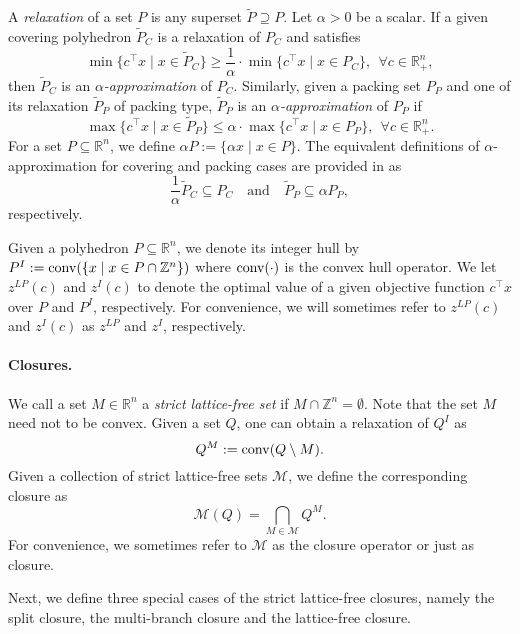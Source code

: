 \documentclass[11pt]{article}
\newcommand{\Z}{\mathbb{Z}}
\newcommand{\R}{\mathbb{R}}
\newcommand{\seq}{\subseteq}
\DeclareMathOperator{\conv}{conv}
\newcommand{\Mset}{M}
\newcommand{\M}{\mathcal{\Mset}}
\newcommand{\cred}{\color{black}}
\newcommand{\zLPc}{z^{LP}(c)}
\newcommand{\zIc}{z^{I}(c)}
\def\conv{\mathop{\rm conv}}
\begin{document}
  
{\cred  A \emph{relaxation} of a set $P$ is any superset $\tilde{P} \supseteq P$.} Let $\alpha > 0$ be a scalar. If a given covering polyhedron $\tilde{P}_C$ is a relaxation of $P_C$ and satisfies
$$\min\{c^\top x \mid x \in \tilde{P}_C\} \ge \frac{1}{\alpha} \cdot \min\{c^\top x \mid x \in P_C\}, \ \ \forall c \in \R_+^n,$$
then $\tilde{P}_C$ is an \emph{$\alpha$-approximation} of $P_C$. Similarly, given a packing set $P_P$ and one of its relaxation $\tilde{P}_P$ of packing type, $\tilde{P}_P$ is an \emph{$\alpha$-approximation} of $P_P$ if 
$$\max\{c^\top x \mid x \in \tilde{P}_P\} \le \alpha \cdot \max\{c^\top x \mid x \in P_P \}, \ \ \forall c \in \R_+^n.$$
For a set $P \subseteq \R^n$, we define $\alpha P:= \{\alpha x \mid  x \in P\}$. 
The equivalent definitions of $\alpha$-approximation for covering and packing cases are provided in \cite{bodur2016aggregation} as
$$\frac{1}{\alpha} \tilde{P}_C  \seq P_C \quad \text{and} \quad \tilde{P}_P \seq \alpha P_P,$$
respectively.

Given a polyhedron $P \seq \R^n$, we denote its integer hull by $P^I := \conv( \{x \mid x \in P \cap \Z^n\})$ where $\conv(\cdot)$ is the convex hull operator. We let $\zLPc$ and $\zIc$ to denote the optimal value of a given objective function $c^\top x$ over $P$ and $P^I$, respectively. For convenience, we will sometimes refer to $\zLPc$ and $\zIc$ as $z^{LP}$ and $z^{I}$, respectively.

\paragraph{Closures.}
We call a set $\Mset \in \R^n$ a \emph{strict lattice-free set} if $M \cap \Z^n = \emptyset$. Note that the set $\Mset$ need not to be convex. Given a set $Q$, one can obtain a relaxation of $Q^I$ as 
$$Q^\Mset := \conv(Q \setminus \Mset).$$  
Given a collection of strict lattice-free sets $\M$, we define the corresponding closure as
$$\M(Q) = \bigcap_{\Mset \in \M} Q^\Mset.$$
For convenience, we sometimes refer to $\M$ as the closure operator or just as closure.

Next, we define three special cases of the strict lattice-free closures, namely the split closure, the multi-branch closure and the lattice-free closure.
\end{document}

